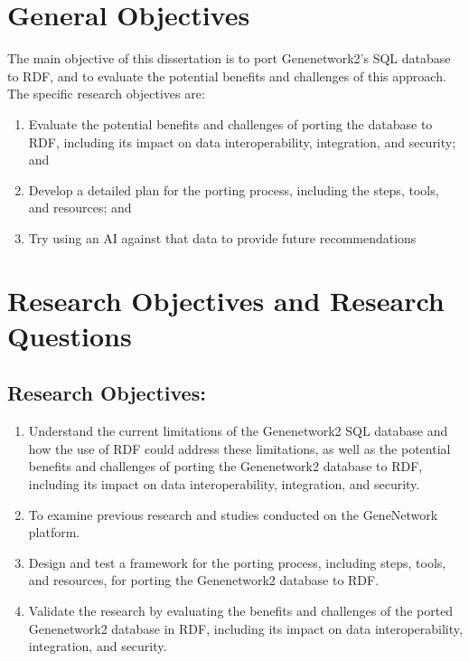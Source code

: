 \section{General Objectives}

The main objective of this dissertation is to port Genenetwork2's SQL database to RDF, and to evaluate the potential benefits and challenges of this approach.  The specific research objectives are:

\begin{enumerate}
\item Evaluate the potential benefits and challenges of porting the database to RDF, including its impact on data interoperability, integration, and security; and
\item Develop a detailed plan for the porting process, including the steps, tools, and resources; and
\item Try using an AI against that data to provide future recommendations
\end{enumerate}


\section{Research Objectives and Research Questions}

\subsection*{Research Objectives:}

\begin{enumerate}
\item Understand the current limitations of the Genenetwork2 SQL database and how the use of RDF could address these limitations, as well as the potential benefits and challenges of porting the Genenetwork2 database to RDF, including its impact on data interoperability, integration, and security.
  \item To examine previous research and studies conducted on the GeneNetwork platform.
\item Design and test a framework for the porting process, including steps, tools, and resources, for porting the Genenetwork2 database to RDF.
\item Validate the research by evaluating the benefits and challenges of the ported Genenetwork2 database in RDF, including its impact on data interoperability, integration, and security.
\end{enumerate}

